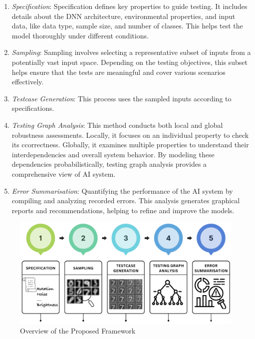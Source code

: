 \begin{enumerate}
  \item \emph{Specification}: Specification defines key properties to guide testing. It includes details about the DNN architecture, environmental properties, and input data, like data type, sample size, and number of classes. This helps test the model thoroughly under different conditions.
    \item \emph{Sampling}: Sampling involves selecting a representative subset of inputs from a potentially vast input space. Depending on the testing objectives, this subset helps ensure that the tests are meaningful and cover various scenarios effectively.
    \item \emph{Testcase Generation}: This process uses the sampled inputs according to specifications.
    \item \emph{Testing Graph Analysis}: This method conducts both local and global robustness assessments. Locally, it focuses on an individual property to check its ccorrectness. Globally, it examines multiple properties to understand their interdependencies and overall system behavior. By modeling these dependencies probabilistically, testing graph analysis provides a comprehensive view of AI system.
    \item \emph{Error Summarisation}: Quantifying the performance of the AI system by compiling and analyzing recorded errors. This analysis generates graphical reports and recommendations, helping to refine and improve the models.
\end{enumerate}

\begin{figure}
  \centering
  \includegraphics[width=\linewidth]{figures/fivesteps.png}
  \caption{Overview of the Proposed Framework}
  \label{fig:framework}
\end{figure}



